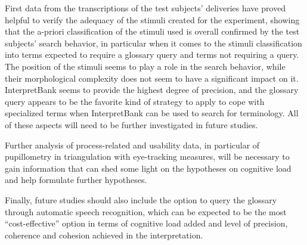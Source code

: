 \documentclass[output=paper]{langsci/langscibook}
\begin{document}
First data from the transcriptions of the test subjects’ deliveries have proved helpful to verify the adequacy of the stimuli created for the experiment, showing that the a-priori classification of the stimuli used is overall confirmed by the test subjects’ search behavior, in particular when it comes to the stimuli classification into terms expected to require a glossary query and terms not requiring a query. The position of the stimuli seems to play a role in the search behavior, while their morphological complexity does not seem to have a significant impact on it. InterpretBank seems to provide the highest degree of precision, and the glossary query appears to be the favorite kind of strategy to apply to cope with specialized terms when InterpretBank can be used to search for terminology. All of these aspects will need to be further investigated in future studies.

Further analysis of process-related and usability data, in particular of pupillometry in triangulation with eye-tracking measures, will be necessary to gain information that can shed some light on the hypotheses on cognitive load and help formulate further hypotheses.

Finally, future studies should also include the option to query the glossary through automatic speech recognition, which can be expected to be the most ``cost-effective'' option in terms of cognitive load added and level of precision, coherence and cohesion achieved in the interpretation. 
\sloppy
\printbibliography[heading=subbibliography,notkeyword=this] 
\end{document}
